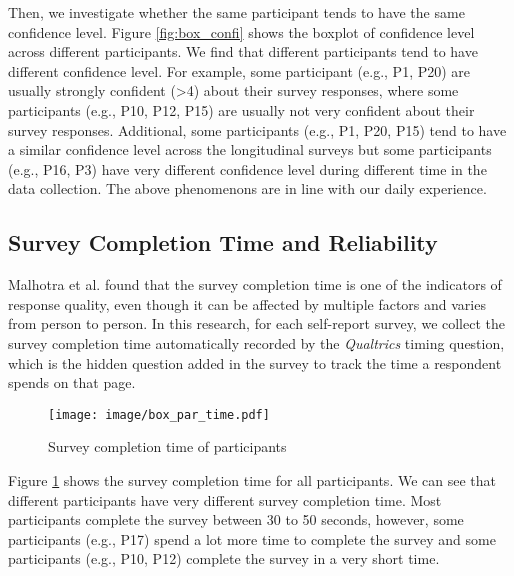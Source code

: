 \documentclass[sigconf]{acmart}
\begin{document}
Then, we investigate whether the same participant tends to have the same confidence level. Figure \ref{fig:box_confi} shows the boxplot of confidence level across different participants. We find that different participants tend to have different confidence level. For example,  some participant (e.g., P1, P20) are usually strongly confident (>4) about their survey responses, where some participants (e.g., P10, P12, P15) are usually not very confident about their survey responses. Additional, some participants (e.g., P1, P20, P15) tend to have a similar confidence level across the longitudinal surveys but some participants (e.g., P16, P3) have very different confidence level during different time in the data collection. The above phenomenons are in line with our daily experience.




\subsection{Survey Completion Time and Reliability}

Malhotra et al. \cite{malhotra2008completion} found that the survey completion time is one of the indicators of response quality, even though it can be affected by multiple factors and varies from person to person. In this research, for each self-report survey, we collect the survey completion time automatically recorded by the \textit{Qualtrics} timing question, which is the hidden question added in the survey to track the time a respondent spends on that page. 

\begin{figure}
    \centering
    \texttt{[image: image/box\_par\_time.pdf]}
    \caption{Survey completion time of participants}
    \label{fig:box_time}
\end{figure}

Figure \ref{fig:box_time} shows the survey completion time for all participants. We can see that different participants have very different survey completion time. Most participants complete the survey between 30 to 50 seconds, however, some participants (e.g., P17) spend a lot more time to complete the survey and some participants (e.g., P10, P12) complete the survey in a very short time.

\end{document}
